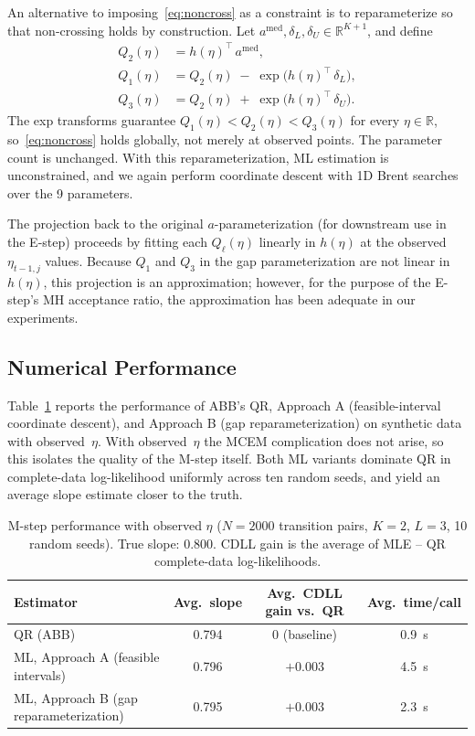 \documentclass[12pt]{article}
\begin{document}
An alternative to imposing~\eqref{eq:noncross} as a constraint is to reparameterize so that non-crossing holds by construction. Let $a^{\mathrm{med}}, \delta_{L}, \delta_{U} \in \mathbb{R}^{K+1}$, and define
\begin{align}
Q_{2}(\eta) &= h(\eta)^{\top}\, a^{\mathrm{med}}, \label{eq:gap_med}\\
Q_{1}(\eta) &= Q_{2}(\eta) \;-\; \exp\bigl(h(\eta)^{\top}\, \delta_{L}\bigr), \label{eq:gap_low}\\
Q_{3}(\eta) &= Q_{2}(\eta) \;+\; \exp\bigl(h(\eta)^{\top}\, \delta_{U}\bigr). \label{eq:gap_up}
\end{align}
The exp transforms guarantee $Q_{1}(\eta) < Q_{2}(\eta) < Q_{3}(\eta)$ for every $\eta \in \mathbb{R}$, so~\eqref{eq:noncross} holds globally, not merely at observed points. The parameter count is unchanged. With this reparameterization, ML estimation is unconstrained, and we again perform coordinate descent with 1D Brent searches over the 9 parameters.

The projection back to the original $a$-parameterization (for downstream use in the E-step) proceeds by fitting each $Q_{\ell}(\eta)$ linearly in $h(\eta)$ at the observed $\eta_{t-1,j}$ values. Because $Q_{1}$ and $Q_{3}$ in the gap parameterization are not linear in $h(\eta)$, this projection is an approximation; however, for the purpose of the E-step's MH acceptance ratio, the approximation has been adequate in our experiments.

\subsection{Numerical Performance}

Table~\ref{tab:mstep_obs} reports the performance of ABB's QR, Approach A (feasible-interval coordinate descent), and Approach B (gap reparameterization) on synthetic data with observed~$\eta$. With observed~$\eta$ the MCEM complication does not arise, so this isolates the quality of the M-step itself. Both ML variants dominate QR in complete-data log-likelihood uniformly across ten random seeds, and yield an average slope estimate closer to the truth.

\begin{table}[t]
\centering
\caption{M-step performance with observed $\eta$ ($N = 2000$ transition pairs, $K = 2$, $L = 3$, 10 random seeds). True slope: $0.800$. CDLL gain is the average of MLE -- QR complete-data log-likelihoods.}
\label{tab:mstep_obs}
\begin{tabular}{lccc}
\toprule
Estimator & Avg.\ slope & Avg.\ CDLL gain vs.\ QR & Avg.\ time/call \\
\midrule
QR (ABB) & 0.794 & 0 (baseline) & 0.9~s \\
ML, Approach A (feasible intervals) & 0.796 & $+0.003$ & 4.5~s \\
ML, Approach B (gap reparameterization) & 0.795 & $+0.003$ & 2.3~s \\
\bottomrule
\end{tabular}
\end{table}
\end{document}
